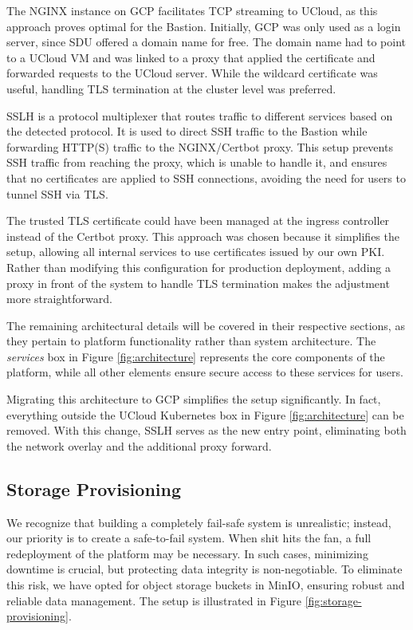 The NGINX instance on GCP facilitates TCP streaming to UCloud, as this approach proves optimal for the Bastion. Initially, GCP was only used as a login server, since SDU offered a domain name for free. The domain name had to point to a UCloud VM and was linked to a proxy that applied the certificate and forwarded requests to the UCloud server. While the wildcard certificate was useful, handling TLS termination at the cluster level was preferred.

SSLH is a protocol multiplexer that routes traffic to different services based on the detected protocol. It is used to direct SSH traffic to the Bastion while forwarding HTTP(S) traffic to the NGINX/Certbot proxy. This setup prevents SSH traffic from reaching the proxy, which is unable to handle it, and ensures that no certificates are applied to SSH connections, avoiding the need for users to tunnel SSH via TLS.

The trusted TLS certificate could have been managed at the ingress controller instead of the Certbot proxy. This approach was chosen because it simplifies the setup, allowing all internal services to use certificates issued by our own PKI. Rather than modifying this configuration for production deployment, adding a proxy in front of the system to handle TLS termination makes the adjustment more straightforward.

The remaining architectural details will be covered in their respective sections, as they pertain to platform functionality rather than system architecture. The \textit{services} box in Figure \ref{fig:architecture} represents the core components of the platform, while all other elements ensure secure access to these services for users.

Migrating this architecture to GCP simplifies the setup significantly. In fact, everything outside the UCloud Kubernetes box in Figure \ref{fig:architecture} can be removed. With this change, SSLH serves as the new entry point, eliminating both the network overlay and the additional proxy forward. 

\subsection{Storage Provisioning}

We recognize that building a completely fail-safe system is unrealistic; instead, our priority is to create a safe-to-fail system. When shit hits the fan, a full redeployment of the platform may be necessary. In such cases, minimizing downtime is crucial, but protecting data integrity is non-negotiable. To eliminate this risk, we have opted for object storage buckets in MinIO, ensuring robust and reliable data management. The setup is illustrated in Figure \ref{fig:storage-provisioning}.

